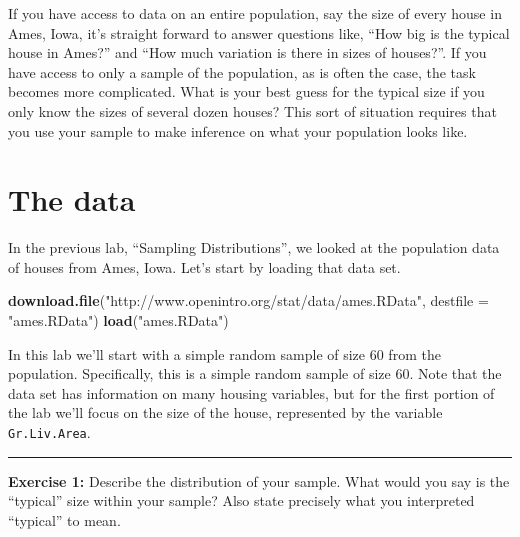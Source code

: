 \documentclass[]{book}
\newenvironment{Shaded}{\begin{snugshade}}{\end{snugshade}}
\newcommand{\KeywordTok}[1]{\textcolor[rgb]{0.13,0.29,0.53}{\textbf{{#1}}}}
\newcommand{\DataTypeTok}[1]{\textcolor[rgb]{0.13,0.29,0.53}{{#1}}}
\newcommand{\DecValTok}[1]{\textcolor[rgb]{0.00,0.00,0.81}{{#1}}}
\newcommand{\StringTok}[1]{\textcolor[rgb]{0.31,0.60,0.02}{{#1}}}
\newcommand{\NormalTok}[1]{{#1}}
\theoremstyle{definition}
\theoremstyle{definition}
\theoremstyle{definition}
\theoremstyle{remark}
\begin{document}
If you have access to data on an entire population, say the size of
every house in Ames, Iowa, it's straight forward to answer questions
like, ``How big is the typical house in Ames?'' and ``How much variation
is there in sizes of houses?''. If you have access to only a sample of
the population, as is often the case, the task becomes more complicated.
What is your best guess for the typical size if you only know the sizes
of several dozen houses? This sort of situation requires that you use
your sample to make inference on what your population looks like.

\section{The data}\label{the-data-2}

In the previous lab, ``Sampling Distributions'', we looked at the
population data of houses from Ames, Iowa. Let's start by loading that
data set.

\begin{Shaded}
\begin{Highlighting}[]
\KeywordTok{download.file}\NormalTok{(}\StringTok{"http://www.openintro.org/stat/data/ames.RData"}\NormalTok{, }\DataTypeTok{destfile =} \StringTok{"ames.RData"}\NormalTok{)}
\KeywordTok{load}\NormalTok{(}\StringTok{"ames.RData"}\NormalTok{)}
\end{Highlighting}
\end{Shaded}

In this lab we'll start with a simple random sample of size 60 from the
population. Specifically, this is a simple random sample of size 60.
Note that the data set has information on many housing variables, but
for the first portion of the lab we'll focus on the size of the house,
represented by the variable \texttt{Gr.Liv.Area}.

\begin{Shaded}
\end{Shaded}

\begin{center}\rule{0.5\linewidth}{\linethickness}\end{center}

\textbf{Exercise 1:} Describe the distribution of your sample. What
would you say is the ``typical'' size within your sample? Also state
precisely what you interpreted ``typical'' to mean.
\end{document}
